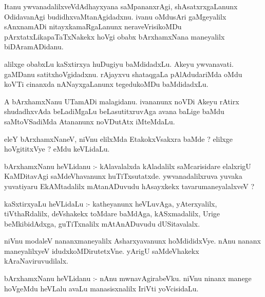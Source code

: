\documentclass{article}
\begin{document}
\begin{mn}
Itanu  ywvanadalilxveVdAdhayxyana  saMpananxrAgi,  shAsatxrxgaLanunx  OdidavanAgi  budidhxvaMtanAgidadxnu.  
ivanu  oMdusAri  gaMgeyalilx  sAnxnamADi  nitayxkamaRgaLanunx  neraveVrisikoMDu  pArxtatxLikapaTaTxNakekx  
hoVgi  obabx  bArxhamxNana  maneyalilx  biDAramADidanu.
\end{mn}

\begin{mn}
alilxge  obabxLu  kaSxtirxya  huDugiyu  baMdidadxLu.  Akeyu  ywvanavati.  gaMDanu  satitxhoVgidadxnu.  
rAjayxvu  shataqgaLa  pAlAdudariMda  oMdu koVTi  cinanxda nANayxgaLanunx  tegedukoMDu  baMdidadxLu.
\end{mn}

\begin{mn}
A  bArxhamxNanu  UTamADi  malagidanu.  ivananunx  noVDi  Akeyu  rAtirx  shudadhxvAda  beLadiMgaLu  
beLasutitxruvAga  avana  baLige  baMdu  saMtoVSadiMda  Atananunx  noVDutAtx  iMteMdaLu.
\end{mn}

\begin{mn}
eleY  bArxhamxNaneV,  niVnu  elilxMda  EtakokxVsakxra  baMde ?  elilxge  hoVgititxVye ?  eMdu  keVLidaLu.
\end{mn}

\begin{mn}
bArxhamxNanu  heVLidanu :- kAlavalalxda  kAladalilx  saMcarisidare  elalxrigU  KaMDitavAgi  saMdeVhavanunx  
huTiTxsutatxde.  ywvanadalilxruva  yuvaka yuvatiyaru  EkAMtadalilx  mAtanADuvudu  hAsayxkekx  tavarumaneyalalxveV ?
\end{mn}

\begin{mn}
kaSxtirxyaLu  heVLidaLu :- katheyanunx  heVLuvAga,  yAterxyalilx,  tiVthaRdalilx,  deVshakekx  toMdare  baMdAga,  
kASxmadalilx,  Urige  beMkibidAdxga,  guTiTxnalilx  mAtAnADuvudu  dUSitavalalx.
\end{mn}

\begin{mn}
niVnu  modaleV  nananxmaneyalilx  Asharxyavanunx  hoMdididxVye.  nAnu  nananx  maneyalilxyeV  idudxkoMDirutetxVne.  
yArigU  saMdeVhakekx  kAraNaviruvudilalx.
\end{mn}

\begin{mn}
bArxhamxNanu  heVLidanu :- nAnu  mwnavAgirabeVku.  niVnu  ninanx  manege  hoVgeMdu  heVLalu  avaLu  manasisxnalilx  
IriVti  yoVcisidaLu.
\end{mn}
\end{document}
